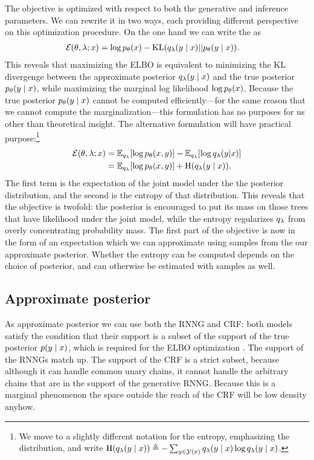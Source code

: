    The objective is optimized with respect to both the generative and inference parameters. We can rewrite it in two ways, each providing different perspective on this optimization procedure. On the one hand we can write the as \citep{blei2016vi}
    \begin{align*}
      \operatorname{\mathcal{E}}(\theta, \lambda; x) &= \log p_{\theta}(x) - \operatorname{KL}(q_{\lambda}(y \mid x) \rvert\lvert p_{\theta}(y \mid x)).
    \end{align*}
    This reveals that maximizing the ELBO is equivalent to minimizing the KL divergenge between the approximate posterior $q_{\lambda}(y \mid x)$ and the true posterior $p_{\theta}(y \mid x)$, while maximizing the marginal log likelihood $\log p_{\theta}(x)$. Because the true posterior $p_{\theta}(y \mid x)$ cannot be computed efficiently---for the same reason that we cannot compute the marginalization---this formulation has no purposes for us other than theoretical insight. The alternative formulation will have practical purpose:\footnote{We move to a slightly different notation for the entropy, emphasizing the distribution, and write $\operatorname{H}(q_{\lambda}(y \mid x)) \triangleq - \sum_{y \in \mathcal{Y}(x)} q_{\lambda}(y \mid x) \log q_{\lambda}(y \mid x)$.}
    \begin{align}
      \operatorname{\mathcal{E}}(\theta, \lambda; x)
        &= \operatorname{\mathbb{E}}_{q_{\lambda}} [ \log p_{\theta}( x, y ) ] - \operatorname{\mathbb{E}}_{q_{\lambda}} [ \log q_{\lambda}(y | x) ]  \nonumber \\
        &= \operatorname{\mathbb{E}}_{q_{\lambda}} [ \log p_{\theta}( x, y ) ] + \operatorname{H}(q_{\lambda}(y \mid x)).
    \end{align}
    The first term is the expectation of the joint model under the the posterior distribution, and the second is the entropy of that distribution. This reveals that the objective is twofold: the posterior is encouraged to put its mass on those trees that have likelihood under the joint model, while the entropy regularizes $q_{\lambda}$ from overly concentrating probability mass. The first part of the objective is now in the form of an expectation which we can approximate using samples from the our approximate posterior. Whether the entropy can be computed depends on the choice of posterior, and can otherwise be estimated with samples as well.

  \subsection{Approximate posterior}
    As approximate posterior we can use both the RNNG and CRF: both models satisfy the condition that their support is a subset of the support of the true posterior $p(y \mid x)$, which is required for the ELBO optimization \citep{kucukelbir2017automatic}. The support of the RNNGs match up. The support of the CRF is a strict subset, because although it can handle common unary chains, it cannot handle the arbitrary chains that are in the support of the generative RNNG. Because this is a marginal phenomenon the space outside the reach of the CRF will be low density anyhow.

